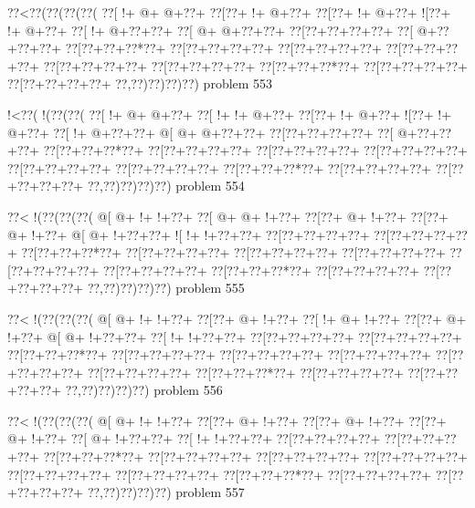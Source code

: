 \vbox{\vbox{\goo
\0??<\0??(\0??(\0??(\0??(
\0??[\- !+\- @+\- @+\0??+
\0??[\0??+\- !+\- @+\0??+
\0??[\0??+\- !+\- @+\0??+
\- ![\0??+\- !+\- @+\0??+
\0??[\- !+\- @+\0??+\0??+
\0??[\- @+\- @+\0??+\0??+
\0??[\0??+\0??+\0??+\0??+
\0??[\- @+\0??+\0??+\0??+
\0??[\0??+\0??+\0??*\0??+
\0??[\0??+\0??+\0??+\0??+
\0??[\0??+\0??+\0??+\0??+
\0??[\0??+\0??+\0??+\0??+
\0??[\0??+\0??+\0??+\0??+
\0??[\0??+\0??+\0??+\0??+
\0??[\0??+\0??+\0??*\0??+
\0??[\0??+\0??+\0??+\0??+
\0??[\0??+\0??+\0??+\0??+
\0??,\0??)\0??)\0??)\0??)
}
\hfil problem 553\hfil\break
}

\vbox{\vbox{\goo
\- !<\0??(\- !(\0??(\0??(
\0??[\- !+\- @+\- @+\0??+
\0??[\- !+\- !+\- @+\0??+
\0??[\0??+\- !+\- @+\0??+
\- ![\0??+\- !+\- @+\0??+
\0??[\- !+\- @+\0??+\0??+
\- @[\- @+\- @+\0??+\0??+
\0??[\0??+\0??+\0??+\0??+
\0??[\- @+\0??+\0??+\0??+
\0??[\0??+\0??+\0??*\0??+
\0??[\0??+\0??+\0??+\0??+
\0??[\0??+\0??+\0??+\0??+
\0??[\0??+\0??+\0??+\0??+
\0??[\0??+\0??+\0??+\0??+
\0??[\0??+\0??+\0??+\0??+
\0??[\0??+\0??+\0??*\0??+
\0??[\0??+\0??+\0??+\0??+
\0??[\0??+\0??+\0??+\0??+
\0??,\0??)\0??)\0??)\0??)
}
\hfil problem 554\hfil\break
}

\vbox{\vbox{\goo
\0??<\- !(\0??(\0??(\0??(
\- @[\- @+\- !+\- !+\0??+
\0??[\- @+\- @+\- !+\0??+
\0??[\0??+\- @+\- !+\0??+
\0??[\0??+\- @+\- !+\0??+
\- @[\- @+\- !+\0??+\0??+
\- ![\- !+\- !+\0??+\0??+
\0??[\0??+\0??+\0??+\0??+
\0??[\0??+\0??+\0??+\0??+
\0??[\0??+\0??+\0??*\0??+
\0??[\0??+\0??+\0??+\0??+
\0??[\0??+\0??+\0??+\0??+
\0??[\0??+\0??+\0??+\0??+
\0??[\0??+\0??+\0??+\0??+
\0??[\0??+\0??+\0??+\0??+
\0??[\0??+\0??+\0??*\0??+
\0??[\0??+\0??+\0??+\0??+
\0??[\0??+\0??+\0??+\0??+
\0??,\0??)\0??)\0??)\0??)
}
\hfil problem 555\hfil\break
}

\vbox{\vbox{\goo
\0??<\- !(\0??(\0??(\0??(
\- @[\- @+\- !+\- !+\0??+
\0??[\0??+\- @+\- !+\0??+
\0??[\- !+\- @+\- !+\0??+
\0??[\0??+\- @+\- !+\0??+
\- @[\- @+\- !+\0??+\0??+
\0??[\- !+\- !+\0??+\0??+
\0??[\0??+\0??+\0??+\0??+
\0??[\0??+\0??+\0??+\0??+
\0??[\0??+\0??+\0??*\0??+
\0??[\0??+\0??+\0??+\0??+
\0??[\0??+\0??+\0??+\0??+
\0??[\0??+\0??+\0??+\0??+
\0??[\0??+\0??+\0??+\0??+
\0??[\0??+\0??+\0??+\0??+
\0??[\0??+\0??+\0??*\0??+
\0??[\0??+\0??+\0??+\0??+
\0??[\0??+\0??+\0??+\0??+
\0??,\0??)\0??)\0??)\0??)
}
\hfil problem 556\hfil\break
}

\vbox{\vbox{\goo
\0??<\- !(\0??(\0??(\0??(
\- @[\- @+\- !+\- !+\0??+
\0??[\0??+\- @+\- !+\0??+
\0??[\0??+\- @+\- !+\0??+
\0??[\0??+\- @+\- !+\0??+
\0??[\- @+\- !+\0??+\0??+
\0??[\- !+\- !+\0??+\0??+
\0??[\0??+\0??+\0??+\0??+
\0??[\0??+\0??+\0??+\0??+
\0??[\0??+\0??+\0??*\0??+
\0??[\0??+\0??+\0??+\0??+
\0??[\0??+\0??+\0??+\0??+
\0??[\0??+\0??+\0??+\0??+
\0??[\0??+\0??+\0??+\0??+
\0??[\0??+\0??+\0??+\0??+
\0??[\0??+\0??+\0??*\0??+
\0??[\0??+\0??+\0??+\0??+
\0??[\0??+\0??+\0??+\0??+
\0??,\0??)\0??)\0??)\0??)
}
\hfil problem 557\hfil\break
}

